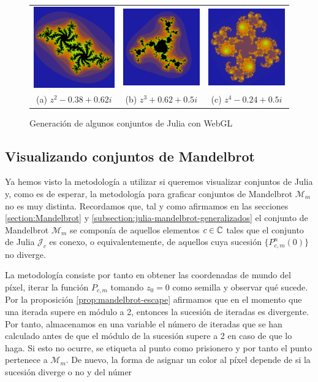 \begin{figure}[ht]
    \centering
    \begin{tabular}{ccc}
      \includegraphics[scale=0.2]{img/C6/julia-1.png} &   \includegraphics[scale=0.2]{img/C6/julia-2.png} &   \includegraphics[scale=0.2]{img/C6/julia-3.png} \\
    (a) $z^2-0.38+0.62i$ & (b) $z^3+0.62+0.5i$ & (c) $z^4-0.24+0.5i$ \\[6pt]
    \end{tabular}
    \caption{Generación de algunos conjuntos de Julia con WebGL}
    \label{fig:julia-webgl}
\end{figure}

\subsection{Visualizando conjuntos de Mandelbrot}

Ya hemos visto la metodología a utilizar si queremos visualizar conjuntos de Julia y, como es de esperar, la metodología para graficar conjuntos de Mandelbrot $\mathcal{M}_m$ no es muy distinta. Recordamos que, tal y como afirmamos en las secciones \ref{section:Mandelbrot} y \ref{subsection:julia-mandelbrot-generalizados} el conjunto de Mandelbrot $\mathcal{M}_m$ se componía de aquellos elementos $c\in\mathbb{C}$ tales que el conjunto de Julia $\mathcal{J}_c$ es conexo, o equivalentemente, de aquellos cuya sucesión $\{P_{c,m}^n(0)\}$ no diverge.

La metodología consiste por tanto en obtener las coordenadas de mundo del píxel, iterar la función $P_{c,m}$ tomando $z_0=0$ como semilla y observar qué sucede. Por la proposición \ref{prop:mandelbrot-escape} afirmamos que en el momento que una iterada supere en módulo a 2, entonces la sucesión de iteradas es divergente. Por tanto, almacenamos en una variable el número de iteradas que se han calculado antes de que el módulo de la sucesión supere a 2 en caso de que lo haga. Si esto no ocurre, se etiqueta al punto como prisionero y por tanto el punto pertenece a $\mathcal{M}_m$. De nuevo, la forma de asignar un color al píxel depende de si la sucesión diverge o no y del númer